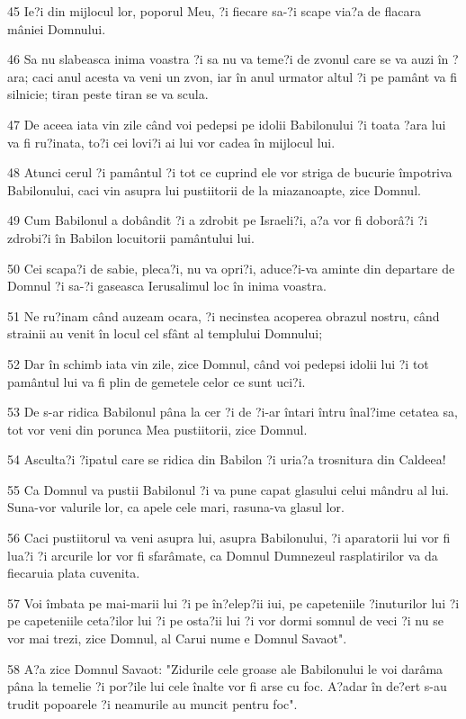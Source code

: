 \par 45 Ie?i din mijlocul lor, poporul Meu, ?i fiecare sa-?i scape via?a de flacara mâniei Domnului.
\par 46 Sa nu slabeasca inima voastra ?i sa nu va teme?i de zvonul care se va auzi în ?ara; caci anul acesta va veni un zvon, iar în anul urmator altul ?i pe pamânt va fi silnicie; tiran peste tiran se va scula.
\par 47 De aceea iata vin zile când voi pedepsi pe idolii Babilonului ?i toata ?ara lui va fi ru?inata, to?i cei lovi?i ai lui vor cadea în mijlocul lui.
\par 48 Atunci cerul ?i pamântul ?i tot ce cuprind ele vor striga de bucurie împotriva Babilonului, caci vin asupra lui pustiitorii de la miazanoapte, zice Domnul.
\par 49 Cum Babilonul a dobândit ?i a zdrobit pe Israeli?i, a?a vor fi doborâ?i ?i zdrobi?i în Babilon locuitorii pamântului lui.
\par 50 Cei scapa?i de sabie, pleca?i, nu va opri?i, aduce?i-va aminte din departare de Domnul ?i sa-?i gaseasca Ierusalimul loc în inima voastra.
\par 51 Ne ru?inam când auzeam ocara, ?i necinstea acoperea obrazul nostru, când strainii au venit în locul cel sfânt al templului Domnului;
\par 52 Dar în schimb iata vin zile, zice Domnul, când voi pedepsi idolii lui ?i tot pamântul lui va fi plin de gemetele celor ce sunt uci?i.
\par 53 De s-ar ridica Babilonul pâna la cer ?i de ?i-ar întari întru înal?ime cetatea sa, tot vor veni din porunca Mea pustiitorii, zice Domnul.
\par 54 Asculta?i ?ipatul care se ridica din Babilon ?i uria?a trosnitura din Caldeea!
\par 55 Ca Domnul va pustii Babilonul ?i va pune capat glasului celui mândru al lui. Suna-vor valurile lor, ca apele cele mari, rasuna-va glasul lor.
\par 56 Caci pustiitorul va veni asupra lui, asupra Babilonului, ?i aparatorii lui vor fi lua?i ?i arcurile lor vor fi sfarâmate, ca Domnul Dumnezeul rasplatirilor va da fiecaruia plata cuvenita.
\par 57 Voi îmbata pe mai-marii lui ?i pe în?elep?ii iui, pe capeteniile ?inuturilor lui ?i pe capeteniile ceta?ilor lui ?i pe osta?ii lui ?i vor dormi somnul de veci ?i nu se vor mai trezi, zice Domnul, al Carui nume e Domnul Savaot".
\par 58 A?a zice Domnul Savaot: "Zidurile cele groase ale Babilonului le voi darâma pâna la temelie ?i por?ile lui cele înalte vor fi arse cu foc. A?adar în de?ert s-au trudit popoarele ?i neamurile au muncit pentru foc".
